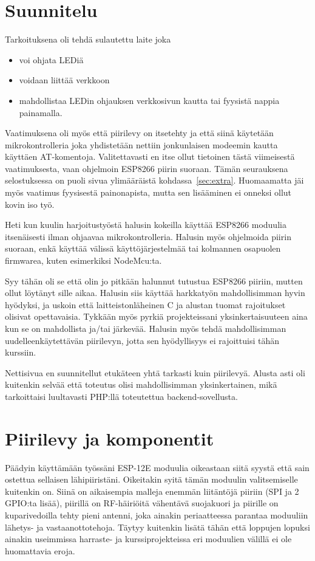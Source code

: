 \section{Suunnitelu}
Tarkoituksena oli tehdä sulautettu laite joka
\begin{itemize}
  \item voi ohjata LEDiä
  \item voidaan liittää verkkoon
  \item mahdollistaa LEDin ohjauksen verkkosivun kautta tai fyysistä nappia
    painamalla.
\end{itemize}
Vaatimuksena oli myös että piirilevy on itsetehty ja että siinä käytetään
mikrokontrolleria joka yhdistetään nettiin jonkunlaisen modeemin kautta
käyttäen AT-komentoja. Valitettavasti en itse ollut tietoinen tästä viimeisestä
vaatimuksesta, vaan ohjelmoin ESP8266 piirin suoraan. Tämän seurauksena
selostuksessa on puoli sivua ylimääräistä kohdassa~\ref{sec:extra}. Huomaamatta
jäi myös vaatimus fyysisestä painonapista, mutta sen lisääminen ei
onneksi ollut kovin iso työ.

Heti kun kuulin harjoitustyöstä halusin kokeilla käyttää ESP8266 moduulia
itsenäisesti ilman ohjaavaa mikrokontrolleria. Halusin myös ohjelmoida piirin
suoraan, enkä käyttää välissä käyttöjärjestelmää tai kolmannen osapuolen
firmwarea, kuten esimerkiksi NodeMcu:ta.\cite{nodemcu}

Syy tähän oli se että olin jo pitkään halunnut tutustua ESP8266 piiriin, mutten
ollut löytänyt sille aikaa. Halusin siis käyttää harkkatyön mahdollisimman
hyvin hyödyksi, ja uskoin että laitteistonläheinen C ja alustan tuomat
rajoitukset olisivat opettavaisia. Tykkään myös pyrkiä projekteissani
yksinkertaisuuteen aina kun se on mahdollista ja/tai järkevää. Halusin myös
tehdä mahdollisimman uudelleenkäytettävän piirilevyn, jotta sen hyödyllisyys ei
rajoittuisi tähän kurssiin.

Nettisivua en suunnitellut etukäteen yhtä tarkasti kuin piirilevyä. Alusta asti
oli kuitenkin selvää että toteutus olisi mahdollisimman yksinkertainen, mikä
tarkoittaisi luultavasti PHP:llä toteutettua backend-sovellusta.

\section{Piirilevy ja komponentit}
Päädyin käyttämään työssäni ESP-12E moduulia oikeastaan siitä syystä että sain
ostettua sellaisen lähipiiristäni. Oikeitakin syitä tämän moduulin
valitsemiselle kuitenkin on. Siinä on aikaisempia malleja enemmän liitäntöjä
piiriin (SPI ja 2 GPIO:ta lisää), piirillä on RF-häiriöitä vähentävä suojakuori
ja piirille on kuparivedoilla tehty pieni antenni, joka ainakin periaatteessa
parantaa moduuliin lähetys- ja vastaanottotehoja. Täytyy kuitenkin lisätä tähän
että loppujen lopuksi ainakin useimmissa harraste- ja kurssiprojekteissa eri
moduulien välillä ei ole huomattavia eroja.

